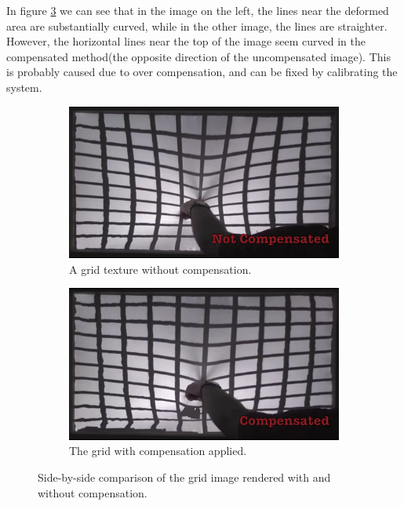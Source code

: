 \documentclass[]{article}
\begin{document}
In figure \ref{fig:GridComparison} we can see that in the image on the left, the lines near the deformed area are substantially curved, while in the other image, the lines are straighter. However, the horizontal lines near the top of the image seem curved in the compensated method(the opposite direction of the uncompensated image). This is probably caused due to over compensation, and can be fixed by calibrating the system.

\begin{figure}[!h]
\centering
\begin{subfigure}{.5\textwidth}
  \centering
  \includegraphics[width=0.9\linewidth]{figures/compensation/GridNotCompensated.png}
  \caption{A grid texture without compensation.}
  \label{fig:GridNotCompensated}
\end{subfigure}%
\begin{subfigure}{.5\textwidth}
  \centering
  \includegraphics[width=0.9\linewidth]{figures/compensation/GridCompensated.png}
  \caption{The grid with compensation applied.}
  \label{fig:GridCompensated}
\end{subfigure}
\caption{Side-by-side comparison of the grid image rendered with and without compensation.}
\label{fig:GridComparison}
\end{figure}
\end{document}

